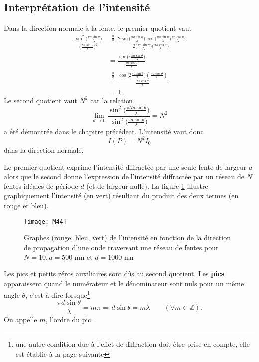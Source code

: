 \subsection{Interprétation de l'intensité}
Dans la direction normale à la fente, le premier quotient vaut
\begin{align*}
\frac{\sin^2\big(\frac{\pi a\sin \theta}{\lambda}\big)}{\big(\frac{\pi a\sin\theta}{\lambda}\big)^2}&\overset{\frac{0}{0}}{=}\frac{2\sin\big(\frac{\pi a\sin \theta}{\lambda}\big)\cos\big(\frac{\pi a\sin \theta}{\lambda}\big)\frac{\pi a\cos \theta}{\lambda}}{2\big(\frac{\pi a\sin\theta}{\lambda}\big)\big(\frac{\pi a\cos\theta}{\lambda}\big)}\\
&=\frac{\sin\big(2\frac{\pi a\sin \theta}{\lambda}\big)}{\frac{\pi a\sin \theta}{\lambda}}\\
&\overset{\frac{0}{0}}{=}\frac{\cos\big(2\frac{\pi a\sin \theta}{\lambda}\big)(\frac{\pi a\cos \theta}{\lambda})}{\frac{\pi a\cos \theta}{\lambda}}\\
&=1.
\end{align*}
Le second quotient vaut $N^2$ car la relation
$$
\lim_{\theta \rightarrow 0}\frac{\sin^2\big(\frac{\pi Nd\sin \theta}{\lambda}\big)}{\sin^2\big(\frac{\pi d\sin \theta}{\lambda}\big)}=N^2
$$
a été démontrée dans le chapitre précédent.
L'intensité vaut donc
$$
    I(P)=N^2I_0
$$
dans la direction normale.

\noindent Le premier quotient exprime l'intensité diffractée par une seule fente de largeur $a$ alors que le second donne l'expression de l'intensité diffractée par un réseau de $N$ fentes idéales de période $d$ (et de largeur nulle). La figure \ref{d11} illustre graphiquement l'intensité (en vert) résultant du produit des deux termes (en rouge et bleu).

\begin{figure}[h!]
    \centering
    \texttt{[image: M44]}
    \caption{Graphes (rouge, bleu, vert) de l'intensité en fonction de la direction de propagation d'une onde traversant une réseau de fentes pour $N=10, a=500$ nm et $d=1000$ nm}
    \label{d11}
\end{figure}

\noindent Les pics et petits zéros auxiliaires sont dûs au second quotient. Les \textbf{pics} apparaissent quand le numérateur et le dénominateur sont nuls pour un même angle $\theta$, c'est-à-dire lorsque\footnote{une autre condition due à l'effet de diffraction doit être prise en compte, elle est établie à la page suivante}
$$
    \frac{\pi d\sin \theta}{\lambda}=m\pi\Rightarrow d\sin \theta=m\lambda \qquad(\forall m\in  \mathbb{Z}).
$$
On appelle $m$, l'ordre du pic.

